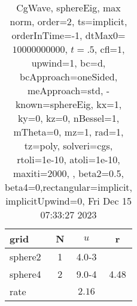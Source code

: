 \begin{table}[H]\tableFont %
\begin{center}
\begin{tabular}{|l|c|c|c|} \hline 
grid  & N &  $ u $ & r \\ \hline 
   sphere2 &     1 & \num{4.0}{-3} &        \\ \hline
   sphere4 &     2 & \num{9.0}{-4} &  4.48  \\ \hline
    rate             &       &  $2.16$       &       \\ \hline
\end{tabular}
\caption{CgWave, sphereEig, max norm, order=$2$, ts=implicit, orderInTime=-1, dtMax0=$10000000000$, $t=.5$, cfl=$1$, upwind=1, bc=d, bcApproach=oneSided, meApproach=std, -known=sphereEig, kx=1, ky=0, kz=0, nBessel=1, mTheta=0, mz=1, rad=1, tz=poly, solveri=cgs, rtoli=1e-10, atoli=1e-10, maxiti=2000, , beta2=0.5, beta4=0,rectangular=implicit, implicitUpwind=0, Fri Dec 15 07:33:27 2023}\label{table:sphereEigOrder2max}
\end{center}
\end{table}
